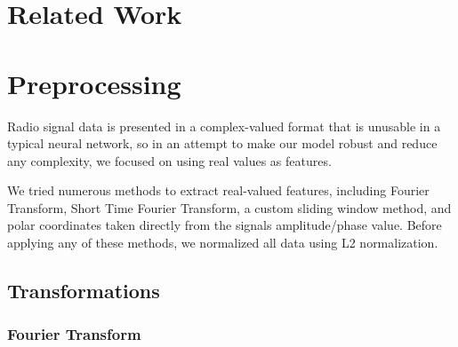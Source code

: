 \documentclass{turabian-thesis}
\begin{document}

\chapter{Related Work}
\label{chap:relatedwork}

\chapter{Preprocessing}
\label{chap:preprocessing}

Radio signal data is presented in a complex-valued format that is unusable in a typical neural network, so in an attempt to make our model robust and reduce any complexity, we focused on using real values as features.

We tried numerous methods to extract real-valued features, including Fourier Transform, Short Time Fourier Transform, a custom sliding window method, and polar coordinates taken directly from the signals amplitude/phase value. Before applying any of these methods, we normalized all data using L2 normalization.





\section{Transformations}


\subsection{Fourier Transform}
\end{document}
